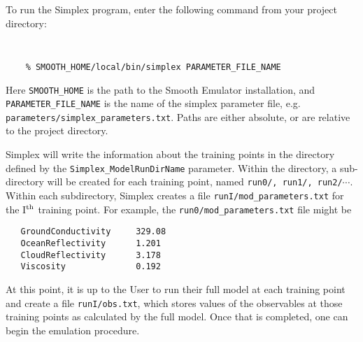 \documentclass[main.tex]{subfiles}
\begin{document}
To run the Simplex program, enter the following command from your project directory:
{\tt
\begin{verbatim}
    % SMOOTH_HOME/local/bin/simplex PARAMETER_FILE_NAME
\end{verbatim}
}
Here {\tt SMOOTH\_HOME} is the path to the Smooth Emulator installation, and {\tt PARAMETER\_FILE\_NAME} is the name of the simplex parameter file, e.g. {\tt parameters/simplex\_parameters.txt}. Paths are either absolute, or are relative to the project directory. 

Simplex will write the information about the training points in the directory defined by the {\tt Simplex\_ModelRunDirName} parameter. Within the directory, a sub-directory will be created for each training point, named {\tt run0/, run1/, run2/}$\cdots$. Within each subdirectory, Simplex creates a file {\tt runI/mod\_parameters.txt} for the I$^{\rm th}$ training point. For example, the {\tt run0/mod\_parameters.txt} file might be
{\tt\begin{verbatim}
   GroundConductivity     329.08
   OceanReflectivity      1.201
   CloudReflectivity      3.178
   Viscosity              0.192
\end{verbatim}
}
At this point, it is up to the User to run their full model at each training point and create a file {\tt runI/obs.txt}, which stores values of the observables at those training points as calculated by the full model. Once that is completed, one can begin the emulation procedure.
\end{document}
